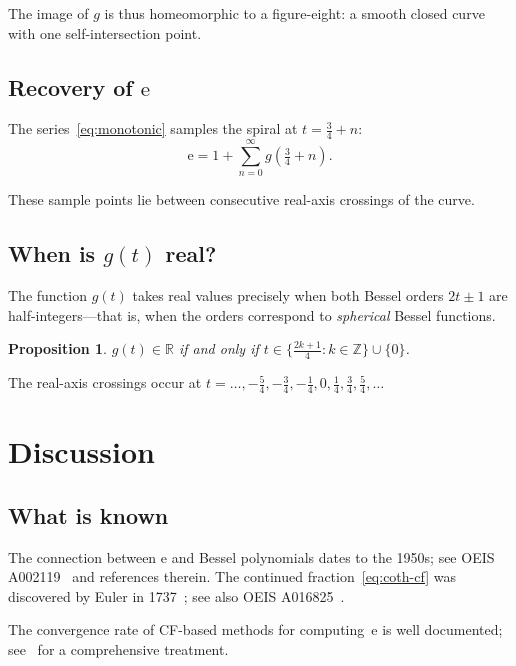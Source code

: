 \documentclass[11pt]{article}
\newtheorem{proposition}[theorem]{Proposition}
\theoremstyle{definition}
\theoremstyle{remark}
\newcommand{\ee}{\mathrm{e}}
\newcommand{\R}{\mathbb{R}}
\newcommand{\Z}{\mathbb{Z}}
\begin{document}
The image of $g$ is thus homeomorphic to a figure-eight: a smooth closed
curve with one self-intersection point.

\subsection{Recovery of $\ee$}

The series~\eqref{eq:monotonic} samples the spiral at $t = \frac{3}{4} + n$:
\begin{equation}
\ee = 1 + \sum_{n=0}^{\infty} g\!\left(\tfrac{3}{4} + n\right).
\end{equation}

These sample points lie between consecutive real-axis crossings of the curve.

\subsection{When is $g(t)$ real?}

The function $g(t)$ takes real values precisely when both Bessel orders
$2t \pm 1$ are half-integers---that is, when the orders correspond to
\emph{spherical} Bessel functions.

\begin{proposition}
$g(t) \in \R$ if and only if $t \in \{\frac{2k+1}{4} : k \in \Z\} \cup \{0\}$.
\end{proposition}

The real-axis crossings occur at
$t = \ldots, -\frac{5}{4}, -\frac{3}{4}, -\frac{1}{4}, 0, \frac{1}{4}, \frac{3}{4}, \frac{5}{4}, \ldots$

\section{Discussion}

\subsection{What is known}

The connection between $\ee$ and Bessel polynomials dates to the 1950s;
see OEIS A002119~\cite{OEIS-A002119} and references therein. The continued
fraction~\eqref{eq:coth-cf} was discovered by Euler in 1737~\cite{Euler1737};
see also OEIS A016825~\cite{OEIS-A016825}.

The convergence rate of CF-based methods for computing~$\ee$ is well documented;
see~\cite{GourdonSebah} for a comprehensive treatment.
\end{document}
